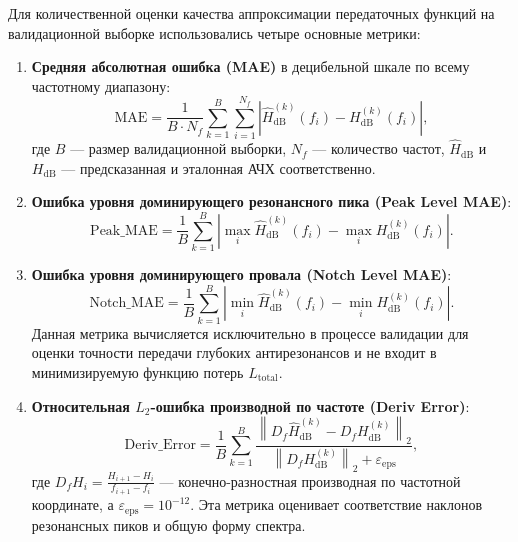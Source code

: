 Для количественной оценки качества аппроксимации передаточных функций на валидационной выборке использовались четыре основные метрики:
\begin{enumerate}
    \item \textbf{Средняя абсолютная ошибка (MAE)} в децибельной шкале по всему частотному диапазону:
    \begin{equation}
        \text{MAE} = \frac{1}{B \cdot N_f} \sum_{k=1}^B \sum_{i=1}^{N_f} \left| \widehat{H}_{\mathrm{dB}}^{(k)}(f_i) - H_{\mathrm{dB}}^{(k)}(f_i) \right|,
    \end{equation}
    где $B$ --- размер валидационной выборки, $N_f$ --- количество частот, $\widehat{H}_{\mathrm{dB}}$ и $H_{\mathrm{dB}}$ --- предсказанная и эталонная АЧХ соответственно.
    
    \item \textbf{Ошибка уровня доминирующего резонансного пика (Peak Level MAE)}:
    \begin{equation}
        \text{Peak\_MAE} = \frac{1}{B} \sum_{k=1}^B \left| \max_{i} \widehat{H}_{\mathrm{dB}}^{(k)}(f_i) - \max_{i} H_{\mathrm{dB}}^{(k)}(f_i) \right|.
    \end{equation}
    
    \item \textbf{Ошибка уровня доминирующего провала (Notch Level MAE)}:
    \begin{equation}
        \text{Notch\_MAE} = \frac{1}{B} \sum_{k=1}^B \left| \min_{i} \widehat{H}_{\mathrm{dB}}^{(k)}(f_i) - \min_{i} H_{\mathrm{dB}}^{(k)}(f_i) \right|.
    \end{equation}
    Данная метрика вычисляется исключительно в процессе валидации для оценки точности передачи глубоких антирезонансов и не входит в минимизируемую функцию потерь $L_{\text{total}}$.
    
    \item \textbf{Относительная $L_2$-ошибка производной по частоте (Deriv Error)}:
    \begin{equation}
        \text{Deriv\_Error} = \frac{1}{B} \sum_{k=1}^B \frac{\left\| D_f \widehat{H}_{\mathrm{dB}}^{(k)} - D_f H_{\mathrm{dB}}^{(k)} \right\|_2}{\left\| D_f H_{\mathrm{dB}}^{(k)} \right\|_2 + \varepsilon_{\mathrm{eps}}},
    \end{equation}
    где $D_f H_i = \frac{H_{i+1} - H_i}{f_{i+1} - f_i}$ --- конечно-разностная производная по частотной координате, а $\varepsilon_{\mathrm{eps}} = 10^{-12}$. Эта метрика оценивает соответствие наклонов резонансных пиков и общую форму спектра.
\end{enumerate}

